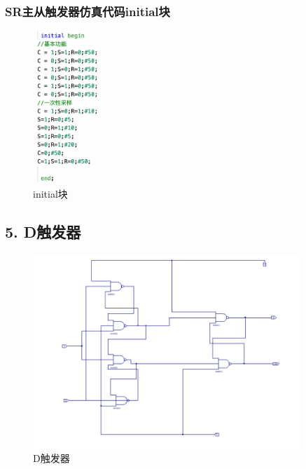 \documentclass{article}
\begin{document}
\subsubsection*{SR主从触发器仿真代码initial块}
    \begin{figure}[H]
    \centering
    \includegraphics[width=0.3\textwidth]{lab9p/13.png}
    \caption{\label{Lab9}initial块}
    \end{figure}

\subsection*{5. D触发器}
    \begin{figure}[H]
    \centering
    \includegraphics[width=0.9\textwidth]{lab9p/9.png}
    \caption{\label{Lab9}D触发器}
    \end{figure}
\end{document}
